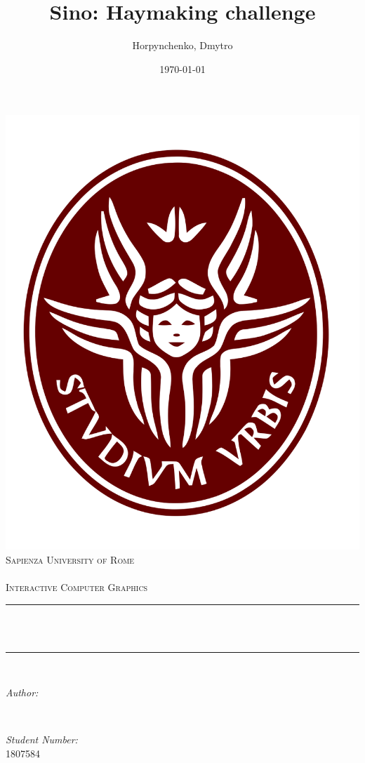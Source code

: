 \documentclass[12pt]{article}
\title{Sino: Haymaking challenge}			%
\author{Horpynchenko, Dmytro} 								%
\date{\today}											%
\makeatletter
\let\thetitle\@title
\let\theauthor\@author
\makeatother
\begin{document}

\begin{titlepage}
	\centering
    \includegraphics[scale = 0.2]{images/sapienza_logo_only.png}\\[1.0 cm]	%
    \textsc{\LARGE Sapienza University of Rome}\\[2.0 cm]	%
	\textsc{\Large  }\\[0.5 cm]				%
	\textsc{\Large Interactive Computer Graphics}\\[0.5 cm]				%
	\rule{\linewidth}{0.2 mm} \\[0.4 cm]
	{ \huge \bfseries \thetitle}\\
	\rule{\linewidth}{0.2 mm} \\[1.5 cm]

	\begin{minipage}{0.4\textwidth}
		\begin{flushleft} \large
			\emph{Author:}\\
			\theauthor
			\end{flushleft}
			\end{minipage}~
			\begin{minipage}{0.4\textwidth}
			\begin{flushright} \large
			\emph{Student Number:} \\
			1807584				%
		\end{flushright}
	\end{minipage}\\[2 cm]


	\vfill

\end{titlepage}
\end{document}
